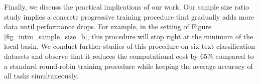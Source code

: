 \documentclass[aos,preprint]{imsart}
\begin{document}




Finally, we discuss the practical implications of our work.
Our sample size ratio study implies a concrete progressive training procedure that gradually adds more data until performance drops.
For example, in the setting of Figure \ref{fig_intro_sample_size_b}, this procedure will stop right at the minimum of the local basin.
We conduct further studies of this procedure on six text classification datasets and observe that it reduces the computational cost by $65\%$ compared to a standard round-robin training procedure while keeping the average accuracy of all tasks simultaneously.
\end{document}
